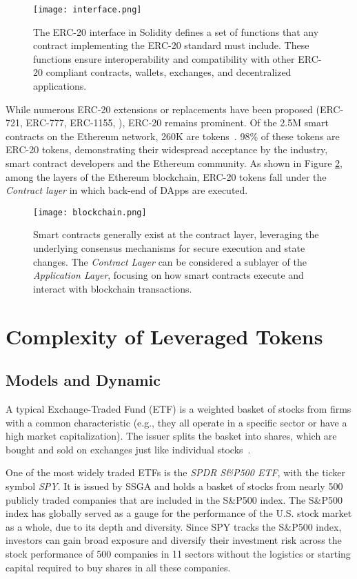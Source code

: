 \begin{figure}[t]
	\centering
	\texttt{[image: interface.png]}
	\caption{The ERC-20 interface in Solidity defines a set of functions that any contract implementing the ERC-20 standard must include. These functions ensure interoperability and compatibility with other ERC-20 compliant contracts, wallets, exchanges, and decentralized applications.}
	\label{fig:interface}
\end{figure}

While numerous ERC-20 extensions or replacements have been proposed (\eg ERC-721, ERC-777, ERC-1155, \etc), ERC-20 remains prominent. Of the 2.5M smart contracts on the Ethereum network, 260K are tokens~\cite{TokenTracker}. 98\% of these tokens are ERC-20 tokens, demonstrating their widespread acceptance by the industry, smart contract developers and the Ethereum community. As shown in Figure \ref{fig:layers}, among the layers of the Ethereum blockchain, ERC-20 tokens fall under the \textit{Contract layer} in which back-end of DApps are executed.

\begin{figure}[t]
	\centering
	\texttt{[image: blockchain.png]}
	\caption{Smart contracts generally exist at the contract layer, leveraging the underlying consensus mechanisms for secure execution and state changes. The \textit{Contract Layer} can be considered a sublayer of the \textit{Application Layer}, focusing on how smart contracts execute and interact with blockchain transactions.}
	\label{fig:layers}
\end{figure}

\section{Complexity of Leveraged Tokens}
\subsection{Models and Dynamic}
A typical Exchange-Traded Fund (ETF) is a weighted basket of stocks from firms with a common characteristic (e.g., they all operate in a specific sector or have a high market capitalization). The issuer splits the basket into shares, which are bought and sold on exchanges just like individual stocks~\cite{liebi2020effect}.
\begin{example}
	One of the most widely traded ETFs is the \textsl{SPDR S\&P500 ETF}, with the ticker symbol \textsl{SPY}. It is issued by SSGA and holds a basket of stocks from nearly 500 publicly traded companies that are included in the S\&P500 index. The S\&P500 index has globally served as a gauge for the performance of the U.S. stock market as a whole, due to its depth and diversity. Since SPY tracks the S\&P500 index, investors can gain broad exposure and diversify their investment risk across the stock performance of 500 companies in 11 sectors without the logistics or starting capital required to buy shares in all these companies.
\end{example}

